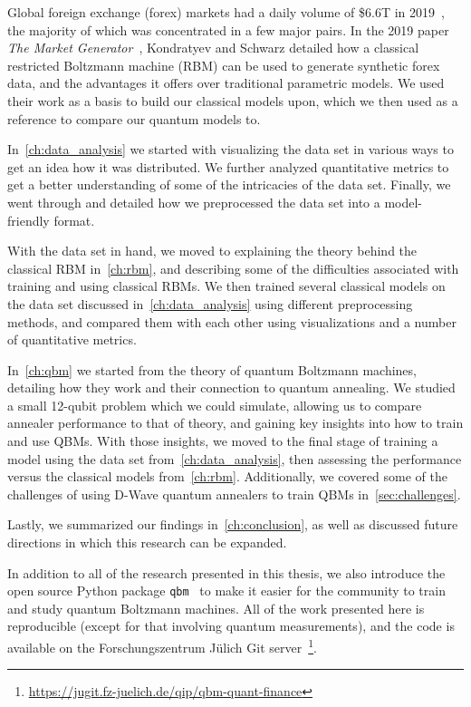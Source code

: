 Global foreign exchange (forex) markets had a daily volume of \$6.6T in 2019~\cite{bis_2019}, the majority of which was concentrated in a few major pairs.
In the 2019 paper \textit{The Market Generator}~\cite{kondratyev_2019}, Kondratyev and Schwarz detailed how a classical restricted Boltzmann machine (RBM) can be used to generate synthetic forex data, and the advantages it offers over traditional parametric models.
We used their work as a basis to build our classical models upon, which we then used as a reference to compare our quantum models to.

In~\cref{ch:data_analysis} we started with visualizing the data set in various ways to get an idea how it was distributed.
We further analyzed quantitative metrics to get a better understanding of some of the intricacies of the data set.
Finally, we went through and detailed how we preprocessed the data set into a model-friendly format.

With the data set in hand, we moved to explaining the theory behind the classical RBM in~\cref{ch:rbm}, and describing some of the difficulties associated with training and using classical RBMs.
We then trained several classical models on the data set discussed in~\cref{ch:data_analysis} using different preprocessing methods, and compared them with each other using visualizations and a number of quantitative metrics.

In~\cref{ch:qbm} we started from the theory of quantum Boltzmann machines, detailing how they work and their connection to quantum annealing.
We studied a small 12-qubit problem which we could simulate, allowing us to compare annealer performance to that of theory, and gaining key insights into how to train and use QBMs.
With those insights, we moved to the final stage of training a model using the data set from~\cref{ch:data_analysis}, then assessing the performance versus the classical models from~\cref{ch:rbm}.
Additionally, we covered some of the challenges of using D-Wave quantum annealers to train QBMs in~\cref{sec:challenges}.

Lastly, we summarized our findings in~\cref{ch:conclusion}, as well as discussed future directions in which this research can be expanded.

In addition to all of the research presented in this thesis, we also introduce the open source Python package \texttt{qbm}~\cite{qbm} to make it easier for the community to train and study quantum Boltzmann machines.
All of the work presented here is reproducible (except for that involving quantum measurements), and the code is available on the Forschungszentrum J\"ulich Git server~\footnote{\url{https://jugit.fz-juelich.de/qip/qbm-quant-finance}}.
